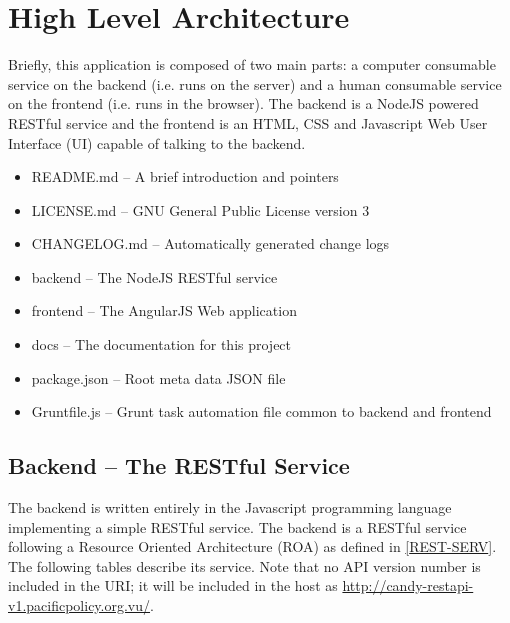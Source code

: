 \documentclass[letterpaper,10pt,english]{sphinxmanual}
\begin{document}
\section{High Level Architecture}
\label{developer-guide:high-level-architecture}
Briefly, this application is composed of two main parts: a computer
consumable service on the backend (i.e. runs on the server) and a
human consumable service on the frontend (i.e. runs in the
browser). The backend is a NodeJS powered RESTful service and the
frontend is an HTML, CSS and Javascript Web User Interface (UI)
capable of talking to the backend.
\begin{itemize}
\item {} 
README.md -- A brief introduction and pointers

\item {} 
LICENSE.md -- GNU General Public License version 3

\item {} 
CHANGELOG.md -- Automatically generated change logs

\item {} 
backend -- The NodeJS RESTful service

\item {} 
frontend -- The AngularJS Web application

\item {} 
docs -- The documentation for this project

\item {} 
package.json -- Root meta data JSON file

\item {} 
Gruntfile.js -- Grunt task automation file common to backend and frontend

\end{itemize}


\subsection{Backend -- The RESTful Service}
\label{developer-guide:rest-service}\label{developer-guide:backend-the-restful-service}
The backend is written entirely in the Javascript programming language
implementing a simple RESTful service. The backend is a RESTful
service following a Resource Oriented Architecture (ROA) as defined in
{\hyperref[developer-guide:rest-serv]{{[}REST-SERV{]}}}. The following tables describe its service. Note that no
API version number is included in the URI; it will be included in the
host as \href{http://candy-restapi-v1.pacificpolicy.org.vu/}{http://candy-restapi-v1.pacificpolicy.org.vu/}.
\end{document}
